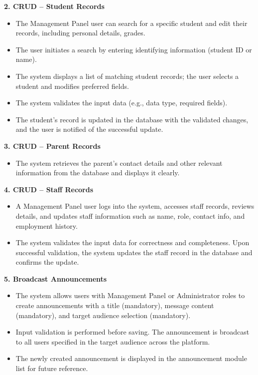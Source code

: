 \documentclass[12pt, a4paper]{report}
\begin{document}
\textbf{2. CRUD -- Student Records}
\begin{itemize}
    \item The Management Panel user can search for a specific student and edit their records, including personal details, grades.
    \item The user initiates a search by entering identifying information (student ID or name).
    \item The system displays a list of matching student records; the user selects a student and modifies preferred fields.
    \item The system validates the input data (e.g., data type, required fields).
    \item The student's record is updated in the database with the validated changes, and the user is notified of the successful update.
\end{itemize}

\textbf{3. CRUD -- Parent Records}
\begin{itemize}
    \item The system retrieves the parent's contact details and other relevant information from the database and displays it clearly.
\end{itemize}

\textbf{4. CRUD -- Staff Records}
\begin{itemize}
    \item A Management Panel user logs into the system, accesses staff records, reviews details, and updates staff information such as name, role, contact info, and employment history.
    \item The system validates the input data for correctness and completeness. Upon successful validation, the system updates the staff record in the database and confirms the update.
\end{itemize}

\textbf{5. Broadcast Announcements}
\begin{itemize}
    \item The system allows users with Management Panel or Administrator roles to create announcements with a title (mandatory), message content (mandatory), and target audience selection (mandatory).
    \item Input validation is performed before saving. The announcement is broadcast to all users specified in the target audience across the platform.
    \item The newly created announcement is displayed in the announcement module list for future reference.
\end{itemize}
\end{document}
